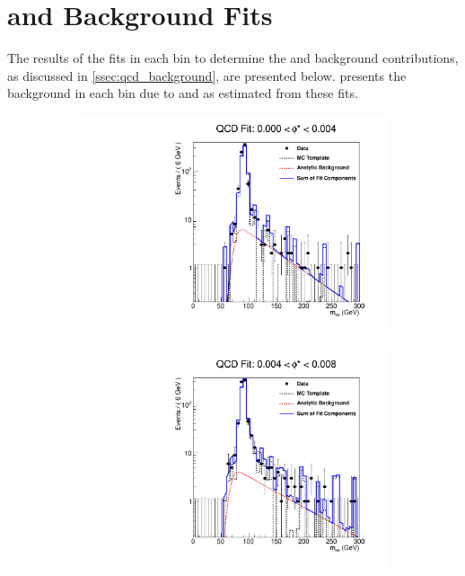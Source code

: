 \chapter{\texorpdfstring{\QCDjets and \wjets}{QCD multi-jet and W+Jets} Background Fits}
\label{app:qcd_fits}

The results of the fits in each \phistar bin to determine the \QCDjets and
\wjets background contributions, as discussed in
\cref{ssec:qcd_background}, are presented below. 
presents the background in each \phistar bin due to \QCDjets and
\wjets as estimated from these fits.

\begin{figure}[!htbp]
    \centering
    \begin{subfigure}[b]{\SideBySidePlotWidth}
        \includegraphics[width=\linewidth]{figures/qcd_fits/qcd_fit_plot_for_01.pdf}
        \label{fig:qcd_fit_01}
    \end{subfigure}%
    \begin{subfigure}[b]{\SideBySidePlotWidth}
        \includegraphics[width=\linewidth]{figures/qcd_fits/qcd_fit_plot_for_02.pdf}

\end{subfigure}
\end{figure}
